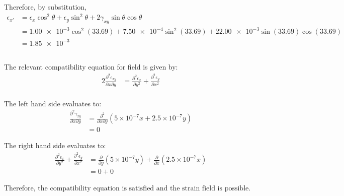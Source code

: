 Therefore, by substitution,
\begin{align*}
    \epsilon_{x'} &= \epsilon_x\cos^2\theta + \epsilon_y\sin^2\theta + 2\gamma_{xy}\sin\theta\cos\theta \\
    &= \qty{1.00e-3}\cos^2(33.69) + \qty{7.50e-4}\sin^2(33.69) + 2\qty{2.00e-3}\sin(33.69)\cos(33.69) \\
    &= \boxed{\qty{1.85e-3}{}}
\end{align*}

\subsection{}
The relevant compatibility equation for field is given by:
\begin{align*}
    2 \frac{\partial^2 \epsilon_{xy}}{\partial x \partial y} &= \frac{\partial^2 \epsilon_{x}}{\partial y^2} + \frac{\partial^2 \epsilon_{y}}{\partial x^2} \\
\end{align*}

The left hand side evaluates to:
\begin{align*}
    \frac{\partial^2 \gamma_{xy}}{\partial x \partial y} &= \frac{\partial^2}{\partial x \partial y}(5\times10^{-7}x + 2.5\times10^{-7}y) \\
    &= 0
\end{align*}

The right hand side evaluates to:
\begin{align*}
    \frac{\partial^2 \epsilon_{x}}{\partial y^2} + \frac{\partial^2 \epsilon_{y}}{\partial x^2} &= \frac{\partial }{\partial y}(5\times 10^{-7}y) + \frac{\partial }{\partial x} (2.5\times 10^{-7}x) \\
    &= 0 + 0
\end{align*}

$\boxed{\text{Therefore, the compatibility equation is satisfied and the strain field is possible.}}$
